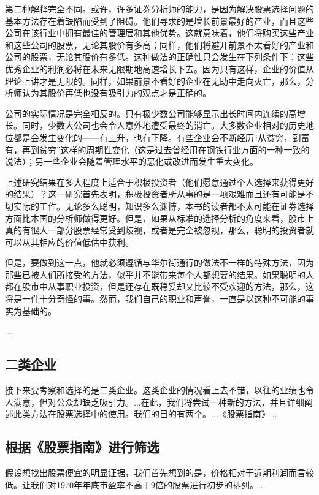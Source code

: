 \documentclass[12pt,oneside]{book}
\begin{document}
第二种解释完全不同。或许，许多证券分析师的能力，是因为解决股票选择问题的基本方法存在着缺陷而受到了阻碍。他们寻求的是增长前景最好的产业，而且这些公司在该行业中拥有最佳的管理层和其他优势。这就意味着，他们将购买这些产业和这些公司的股票，无论其股价有多高；同样，他们将避开前景不太看好的产业和公司的股票，无论其股价有多低。这种做法的正确性只会发生在下列条件下：这些优秀企业的利润必将在未来无限期地高速增长下去。因为只有这样，企业的价值从理论上讲才是无限的。同样，如果前景不看好的企业在无助中走向灭亡，那么，分析师认为其股价再低也没有吸引力的观点才是正确的。

公司的实际情况是完全相反的。只有极少数公司能够显示出长时间内连续的高增长。同时，少数大公司也会令人意外地遭受最终的消亡。大多数企业相对的历史地位都是会发生变化的——有上升，也有下降。有些企业会不断经历“从贫穷，到富有，再到贫穷”这样的周期性变化（这是过去曾经用在钢铁行业方面的一种一致的说法）；另一些企业会随着管理水平的恶化或改进而发生重大变化。

上述研究结果在多大程度上适合于积极投资者（他们愿意通过个人选择来获得更好的结果）？这一研究首先表明，积极投资者所从事的是一项艰难而且还有可能是不切实际的工作。无论多么聪明，知识多么渊博，本书的读者都不太可能在证券选择方面比本国的分析师做得更好。但是，如果从标准的选择分析的角度来看，股市上真的有很大一部分股票经常受到歧视，或者是完全被忽视，那么，聪明的投资者就可以从其相应的价值低估中获利。

但是，要做到这一点，他就必须遵循与华尔街通行的做法不一样的特殊方法，因为那些已被人们所接受的方法，似乎并不能带来每个人都想要的结果。如果聪明的人都在股市中从事职业投资，但是还存在既稳妥却又比较不受欢迎的方法，那么，这将是一件十分奇怪的事。然而，我们自己的职业和声誉，一直是以这种不可能的事实为基础的。

...


\subsection{二类企业}
接下来要考察和选择的是二类企业。这类企业的情况看上去不错，以往的业绩也令人满意，但对公众却缺乏吸引力。...在此，我们将尝试一种新的方法，并且详细阐述此类方法在股票选择中的使用。我们的目的有两个。...《股票指南》...


\subsection{根据《股票指南》进行筛选}
假设想找出股票便宜的明显证据，我们首先想到的是，价格相对于近期利润而言较低。让我们对1970年年底市盈率不高于9倍的股票进行初步的排列。...
\end{document}
